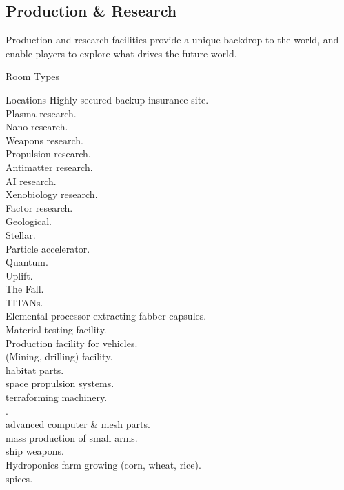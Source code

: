 \documentclass[a4]{book}
\begin{document}
\begin{multicols}{2}

\subsection*{Production \& Research}

Production and research facilities provide a unique backdrop to the world, and
enable players to explore what drives the future world.

Room Types
\end{multicols}

\begin{tableone}{Locations}
Highly secured backup insurance site.\\
Plasma research.\\
Nano research.\\
Weapons research.\\
Propulsion research.\\
Antimatter research.\\
AI research.\\
Xenobiology research.\\
Factor research.\\
Geological.\\
Stellar.\\
Particle accelerator.\\
Quantum.\\
Uplift.\\
The Fall.\\
TITANs.\\
Elemental processor extracting fabber capsules.\\
Material testing facility.\\
Production facility for vehicles.\\
(Mining, drilling) facility.\\
\textellipsis habitat parts.\\
\textellipsis space propulsion systems.\\
\textellipsis terraforming machinery.\\
\textellipsis {}.\\
\textellipsis advanced computer \& mesh parts.\\
\textellipsis mass production of small arms.\\
\textellipsis ship weapons.\\
Hydroponics farm growing (corn, wheat, rice).\\
\textellipsis spices.\\

\end{tableone}
\end{document}
